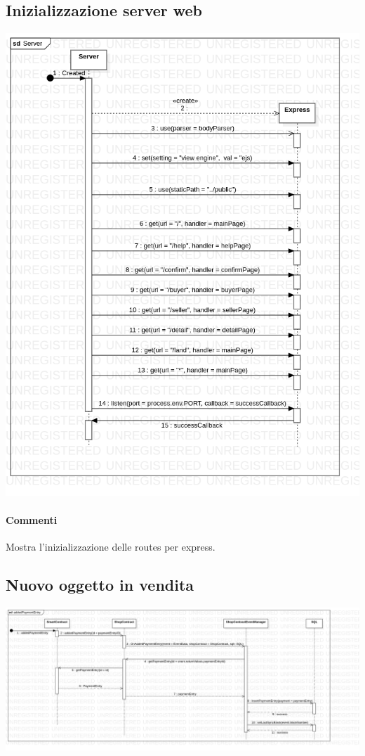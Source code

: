 \documentclass[a4paper, 12pt]{article}
\begin{document}
\subsection{Inizializzazione server web}
\includegraphics[width=1.0\textwidth]{server}
\paragraph{Commenti}
Mostra l'inizializzazione delle routes per express.

\subsection{Nuovo oggetto in vendita}
\includegraphics[width=1.0\textwidth]{addedPaymentEntry}
\end{document}
